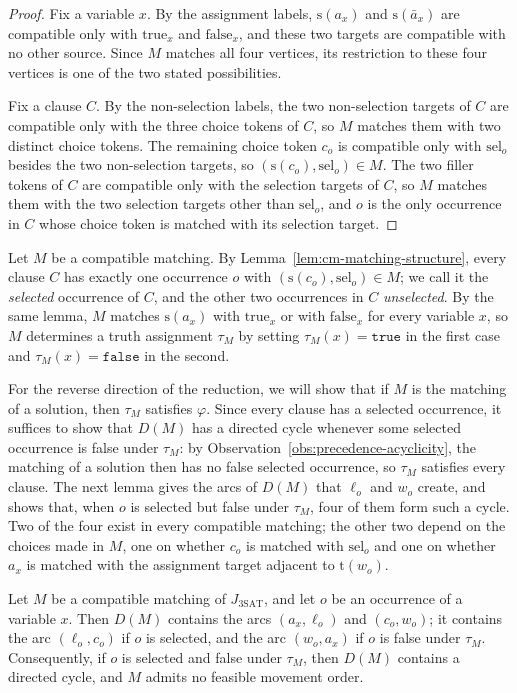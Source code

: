 \documentclass[a4paper,USenglish,thm-restate]{lipics-v2021}
\newcommand{\src}{\mathrm{s}}
\newcommand{\tgt}{\mathrm{t}}
\theoremstyle{problemstyle}
\begin{document}
\begin{proof}
Fix a variable $x$. By the assignment labels, $\src(a_x)$ and
$\src(\bar a_x)$ are compatible only with $\mathrm{true}_x$ and
$\mathrm{false}_x$, and these two targets are compatible with no other
source. Since $M$ matches all four vertices, its restriction to these four vertices is one of the two stated possibilities.

Fix a clause $C$. By the non-selection labels, the two non-selection
targets of $C$ are compatible only with the three choice tokens of $C$, so
$M$ matches them with two distinct choice tokens. The remaining choice
token $c_o$ is compatible only with $\mathrm{sel}_o$ besides the two
non-selection targets, so $(\src(c_o),\mathrm{sel}_o)\in M$. The two
filler tokens of $C$ are compatible only with the selection targets of
$C$, so $M$ matches them with the two selection targets other than
$\mathrm{sel}_o$, and $o$ is the only occurrence in $C$ whose choice token
is matched with its selection target.
\end{proof}

Let $M$ be a compatible matching. By Lemma~\ref{lem:cm-matching-structure},
every clause $C$ has exactly one occurrence $o$ with
$(\src(c_o),\mathrm{sel}_o)\in M$; we call it the \emph{selected}
occurrence of $C$, and the other two occurrences in $C$
\emph{unselected}. By the same lemma, $M$ matches $\src(a_x)$ with
$\mathrm{true}_x$ or with $\mathrm{false}_x$ for every variable $x$, so $M$
determines a truth assignment $\tau_M$ by setting
$\tau_M(x)=\texttt{true}$ in the first case and
$\tau_M(x)=\texttt{false}$ in the second.

For the reverse direction of the reduction, we will show that if $M$ is
the matching of a solution, then $\tau_M$ satisfies $\varphi$. Since every
clause has a selected occurrence, it suffices to show that $D(M)$ has a
directed cycle whenever some selected occurrence is false under $\tau_M$: by
Observation~\ref{obs:precedence-acyclicity}, the matching of a solution then
has no false selected occurrence, so $\tau_M$ satisfies every clause. The next lemma
gives the arcs of $D(M)$ that $\ell_o$ and $w_o$ create, and shows that,
when $o$ is selected but false under $\tau_M$, four of them form such a
cycle. Two of the four exist in every compatible matching; the other two
depend on the choices made in $M$, one on whether $c_o$ is matched with
$\mathrm{sel}_o$ and one on whether $a_x$ is matched with the assignment
target adjacent to $\tgt(w_o)$.

\begin{lemma}\label{lem:cm-cycle}
Let $M$ be a compatible matching of $J_{\mathrm{3SAT}}$, and let $o$ be an occurrence of a
variable $x$. Then $D(M)$ contains the arcs $(a_x,\ell_o)$ and $(c_o,w_o)$;
it contains the arc $(\ell_o,c_o)$ if $o$ is selected, and the arc
$(w_o,a_x)$ if $o$ is false under $\tau_M$. Consequently, if $o$ is
selected and false under $\tau_M$, then $D(M)$ contains a directed cycle,
and $M$ admits no feasible movement order.
\end{lemma}
\end{document}
